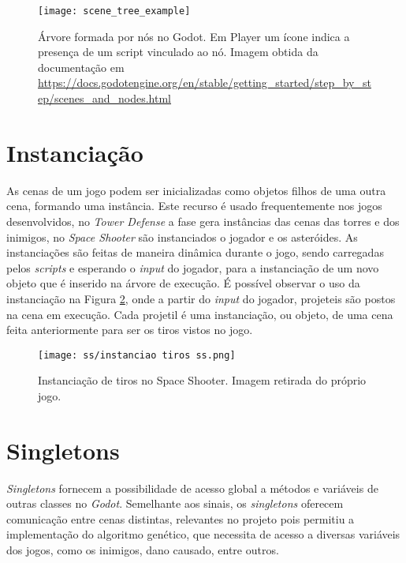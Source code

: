 \begin{figure}
  \centering
  \texttt{[image: scene\_tree\_example]}
  \caption{Árvore formada por nós no Godot. Em Player um ícone indica a presença de um script vinculado ao nó. Imagem obtida da documentação em \url{https://docs.godotengine.org/en/stable/getting_started/step_by_step/scenes_and_nodes.html}\label{fig:scene-tree}}
\end{figure}



\section{Instanciação}
\label{sec:godot-instancia}

As cenas de um jogo podem ser inicializadas como objetos filhos de uma outra cena, formando uma instância. Este recurso é usado frequentemente nos jogos desenvolvidos, no \textit{Tower Defense} a fase gera instâncias das cenas das torres e dos inimigos, no \textit{Space Shooter} são instanciados o jogador e os asteróides. As instanciações são feitas de maneira dinâmica durante o jogo, sendo carregadas pelos \textit{scripts} e esperando o \textit{input} do jogador, para a instanciação de um novo objeto que é inserido na árvore de execução. É possível observar o uso da instanciação na Figura \ref{fig:instancia-tiro}, onde a partir do \textit{input} do jogador, projeteis são postos na cena em execução. Cada projetil é uma instanciação, ou objeto, de uma cena feita anteriormente para ser os tiros vistos no jogo.

\begin{figure}
  \centering
  \texttt{[image: ss/instanciao tiros ss.png]}
  \caption{Instanciação de tiros no Space Shooter. Imagem retirada do próprio jogo.\label{fig:instancia-tiro}}
\end{figure}


\section{Singletons}
\label{sec:godot-singleton}

\textit{Singletons} fornecem a possibilidade de acesso global a métodos e variáveis de outras classes no \textit{Godot}. Semelhante aos sinais, os \textit{singletons} oferecem comunicação entre cenas distintas, relevantes no projeto pois permitiu a implementação do algoritmo genético, que necessita de acesso a diversas variáveis dos jogos, como os inimigos, dano causado, entre outros.


